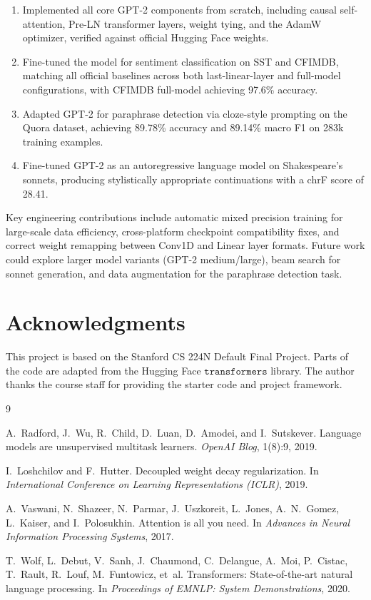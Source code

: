 \documentclass[11pt,a4paper]{article}
\begin{document}
\begin{enumerate}[nosep]
  \item Implemented all core GPT-2 components from scratch, including causal self-attention, Pre-LN transformer layers, weight tying, and the AdamW optimizer, verified against official Hugging Face weights.
  \item Fine-tuned the model for sentiment classification on SST and CFIMDB, matching all official baselines across both last-linear-layer and full-model configurations, with CFIMDB full-model achieving 97.6\% accuracy.
  \item Adapted GPT-2 for paraphrase detection via cloze-style prompting on the Quora dataset, achieving 89.78\% accuracy and 89.14\% macro F1 on 283k training examples.
  \item Fine-tuned GPT-2 as an autoregressive language model on Shakespeare's sonnets, producing stylistically appropriate continuations with a chrF score of 28.41.
\end{enumerate}

Key engineering contributions include automatic mixed precision training for large-scale data efficiency, cross-platform checkpoint compatibility fixes, and correct weight remapping between Conv1D and Linear layer formats. Future work could explore larger model variants (GPT-2 medium/large), beam search for sonnet generation, and data augmentation for the paraphrase detection task.

\section*{Acknowledgments}

This project is based on the Stanford CS 224N Default Final Project. Parts of the code are adapted from the Hugging Face $\texttt{transformers}$ library. The author thanks the course staff for providing the starter code and project framework.


\begin{thebibliography}{9}

A.~Radford, J.~Wu, R.~Child, D.~Luan, D.~Amodei, and I.~Sutskever.
\newblock Language models are unsupervised multitask learners.
\newblock \emph{OpenAI Blog}, 1(8):9, 2019.

I.~Loshchilov and F.~Hutter.
\newblock Decoupled weight decay regularization.
\newblock In \emph{International Conference on Learning Representations (ICLR)}, 2019.

A.~Vaswani, N.~Shazeer, N.~Parmar, J.~Uszkoreit, L.~Jones, A.~N.~Gomez, L.~Kaiser, and I.~Polosukhin.
\newblock Attention is all you need.
\newblock In \emph{Advances in Neural Information Processing Systems}, 2017.

T.~Wolf, L.~Debut, V.~Sanh, J.~Chaumond, C.~Delangue, A.~Moi, P.~Cistac, T.~Rault, R.~Louf, M.~Funtowicz, et~al.
\newblock Transformers: State-of-the-art natural language processing.
\newblock In \emph{Proceedings of EMNLP: System Demonstrations}, 2020.

\end{thebibliography}
\end{document}
